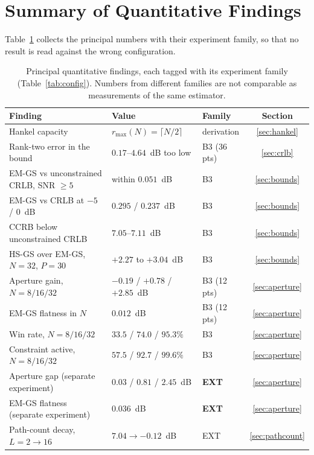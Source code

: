 \documentclass[journal]{IEEEtran}
\newcommand{\rmax}{r_{\max}}
\begin{document}
\section{Summary of Quantitative Findings}\label{sec:summary}

Table~\ref{tab:summary} collects the principal numbers with their experiment
family, so that no result is read against the wrong configuration.

\begin{table}[!t]
\caption{Principal quantitative findings, each tagged with its experiment
family (Table~\ref{tab:config}). Numbers from different families are not
comparable as measurements of the same estimator.}
\label{tab:summary}
\centering
\begin{tabular}{lllc}
\toprule
Finding & Value & Family & Section \\
\midrule
Hankel capacity & $\rmax(N)=\lceil N/2\rceil$ & derivation & \ref{sec:hankel} \\
Rank-two error in the bound & $0.17$--$4.64$~dB too low & B3 (36 pts) & \ref{sec:crlb} \\
EM-GS vs unconstrained CRLB, SNR $\ge5$ & within $0.051$~dB & B3 & \ref{sec:bounds} \\
EM-GS vs CRLB at $-5$ / $0$~dB & $0.295$ / $0.237$~dB & B3 & \ref{sec:bounds} \\
CCRB below unconstrained CRLB & $7.05$--$7.11$~dB & B3 & \ref{sec:bounds} \\
HS-GS over EM-GS, $N=32$, $P=30$ & $+2.27$ to $+3.04$~dB & B3 & \ref{sec:bounds} \\
Aperture gain, $N=8/16/32$ & $-0.19$ / $+0.78$ / $+2.85$~dB & B3 (12 pts) & \ref{sec:aperture} \\
EM-GS flatness in $N$ & $0.012$~dB & B3 (12 pts) & \ref{sec:aperture} \\
Win rate, $N=8/16/32$ & $33.5$ / $74.0$ / $95.3\%$ & B3 & \ref{sec:aperture} \\
Constraint active, $N=8/16/32$ & $57.5$ / $92.7$ / $99.6\%$ & B3 & \ref{sec:aperture} \\
Aperture gap (separate experiment) & $0.03$ / $0.81$ / $2.45$~dB & \textbf{EXT} & \ref{sec:aperture} \\
EM-GS flatness (separate experiment) & $0.036$~dB & \textbf{EXT} & \ref{sec:aperture} \\
Path-count decay, $L=2\to16$ & $7.04\to-0.12$~dB & EXT & \ref{sec:pathcount} \\

\end{tabular}
\end{table}
\end{document}
